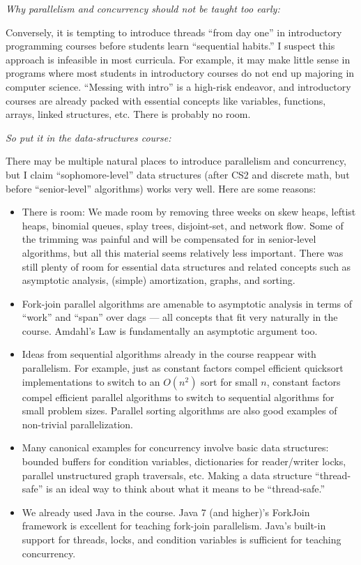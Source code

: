 \documentclass[10pt]{article}
\begin{document}
\medskip
\noindent \emph{Why parallelism and concurrency should not be taught too early:}
\medskip

Conversely, it is tempting to introduce threads ``from day one'' in
introductory programming courses before students learn ``sequential
habits.''  I suspect this approach is infeasible in most curricula.
For example, it may make little sense in programs where most students
in introductory courses do not end up majoring in computer science.
``Messing with intro'' is a high-risk endeavor, and introductory
courses are already packed with essential concepts like variables,
functions, arrays, linked structures, etc.  There is probably no room.

\medskip
\noindent \emph{So put it in the data-structures course:}
\medskip

There may be multiple natural places to introduce parallelism and
concurrency, but I claim ``sophomore-level'' data structures (after
CS2 and discrete math, but before ``senior-level'' algorithms) works
very well.  Here are some reasons:
\begin{itemize}
\item There is room: We made room by removing three weeks
  on skew heaps, leftist heaps, binomial queues, splay
  trees, disjoint-set, and network flow.  Some of the trimming was
  painful and will be compensated for in senior-level algorithms, but
  all this material seems relatively less important.  There was
  still plenty of room for essential data structures and related
  concepts such as asymptotic analysis, (simple) amortization, graphs,
  and sorting.
\item Fork-join parallel algorithms are amenable to asymptotic
  analysis in terms of ``work'' and ``span'' over dags --- all
  concepts that fit very naturally in the course.  Amdahl's Law is
  fundamentally an asymptotic argument too.
\item Ideas from sequential algorithms already in the course
  reappear with parallelism.  For example, just as constant factors compel
  efficient quicksort implementations to switch to an $O(n^2)$ sort
  for small $n$, constant factors compel efficient parallel
  algorithms to switch to sequential algorithms for small problem
  sizes.  Parallel sorting algorithms are also good examples of
  non-trivial parallelization.
\item Many canonical examples for concurrency involve basic
  data structures: bounded buffers for condition variables, dictionaries
  for reader/writer locks, parallel unstructured graph traversals,
  etc.  Making a data structure ``thread-safe'' is an ideal way to
  think about what it means to be ``thread-safe.''
\item We already used Java in the course.  Java 7 (and higher)'s ForkJoin framework
  is excellent for teaching fork-join parallelism.  Java's built-in
  support for threads, locks, and condition variables is sufficient
  for teaching concurrency.  
\end{itemize}
\end{document}
